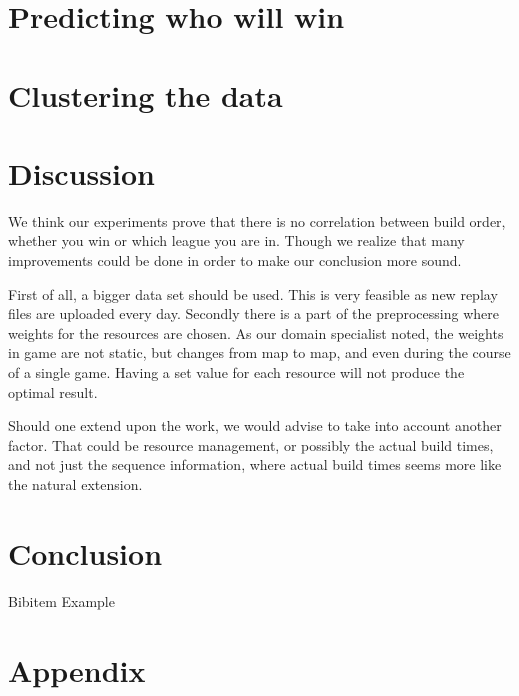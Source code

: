 \documentclass[a4paper,11pt]{article}
\begin{document}
\section{Predicting who will win}

\section{Clustering the data}

\section{Discussion}
We think our experiments prove that there is no correlation between build order, whether you win or which league you are in. Though we realize that many improvements could be done in order to make our conclusion more sound.

First of all, a bigger data set should be used. This is very feasible as new replay files are uploaded every day.
Secondly there is a part of the preprocessing where weights for the resources are chosen. As our domain specialist noted, the weights in game are not static, but changes from map to map, and even during the course of a single game. Having a set value for each resource will not produce the optimal result.

Should one extend upon the work, we would advise to take into account another factor. That could be resource management, or possibly the actual build times, and not just the sequence information, where actual build times seems more like the natural extension.

\section{Conclusion}


\newpage

\begin{thebibliography}{}

Bibitem Example


\end{thebibliography}

\section*{Appendix}
\appendix

%
\end{document}
